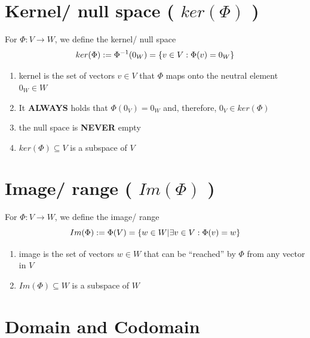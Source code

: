 


\section{Kernel/ null space ( $ker(\Phi)$ ) \cite{mfml-1}}\label{Kernel/ null space}

For $\Phi : V \to W$, we define the kernel/ null space 
\[
    \hfill
    ker(\Phi) := \Phi^{-1}(0_W) = \{v \in V : \Phi(v) = 0_W\}
    \hfill
\]

\begin{enumerate}
    \item kernel is the set of vectors $v \in V$ that $\Phi$ maps onto the neutral element $0_W \in W$

    \item It \textbf{ALWAYS} holds that $\Phi(0_V) = 0_W$ and, therefore, $0_V \in ker(\Phi)$

    \item the null space is \textbf{NEVER} empty

    \item $ker(\Phi) \subseteq V$ is a subspace of $V$

    
\end{enumerate}




\section{Image/ range ( $Im(\Phi)$ ) \cite{mfml-1}}\label{Image/ range}

For $\Phi : V \to W$, we define the image/ range 
\[
    \hfill
    Im(\Phi) := \Phi(V) = \{w \in W | \exists v \in V : \Phi(v) = w\}
    \hfill
\]

\begin{enumerate}
    \item image is the set of vectors $w \in W$ that can be “reached” by $\Phi$ from any vector in $V$

    \item $Im(\Phi) \subseteq W$ is a subspace of $W$
\end{enumerate}




\section{Domain and Codomain \cite{mfml-1}}\label{Domain and Codomain}


